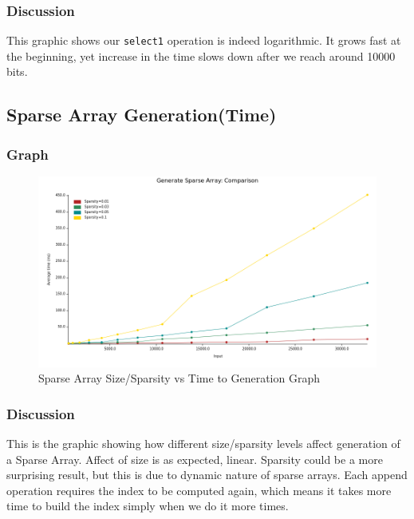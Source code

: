 \documentclass{report}
\begin{document}
\subsubsection*{Discussion}
This graphic shows our \texttt{select1} operation is indeed logarithmic. It grows fast at the beginning, yet increase in the time slows down after we reach around 10000 bits.
\newpage

\subsection*{Sparse Array Generation(Time)}
\subsubsection*{Graph}
\begin{figure}[h!]
    \centering
    \includegraphics[scale=0.5]{sparse_array_gen_sparsity_vs_size.png}
    \caption{Sparse Array Size/Sparsity vs Time to Generation Graph}
    \label{fig:my_label}
\end{figure}
\subsubsection*{Discussion}
This is the graphic showing how different size/sparsity levels affect generation of a Sparse Array. Affect of size is as expected, linear. Sparsity could be a more surprising result, but this is due to dynamic nature of sparse arrays. Each append operation requires the index to be computed again, which means it takes more time to build the index simply when we do it more times.
\newpage
\end{document}
